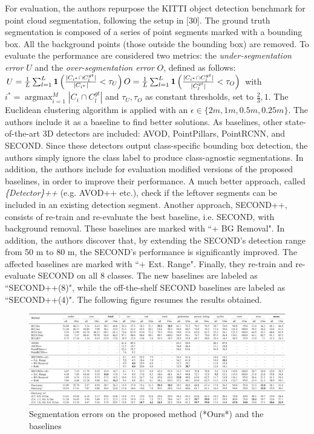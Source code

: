 For evaluation, the authors repurpose the KITTI object detection
benchmark for point cloud segmentation, following the setup in {[}30{]}.
The ground truth segmentation is composed of a series of point segments
marked with a bounding box. All the background points (those outside the
bounding box) are removed. To evaluate the performance are considered
two metrics: the \emph{under-segmentation error} $U$ and the
\emph{over-segmentation error} $O$, defined as follows:
\newline
$ U = \frac{1}{L} \sum _{l=1}^L \mathbf {1} \left(\frac{|C_{i^*} \cap C_l^{gt}|}{|C_{i^*}|} < \tau _U\right) \\ O = \frac{1}{L} \sum _{l=1}^L \mathbf {1} \left(\frac{|C_{i^*} \cap C_l^{gt}|}{|C_l^{gt}|} < \tau _O\right)$
\newline
with
\newline
$ i^* = \operatorname{argmax}_{i=1}^M{|C_i \cap C^{gt}_l|}$
\newline
and $\tau _U, \tau _O$ as constant thresholds, set to
$\frac{2}{3}, 1$.
\newline
The Euclidean clustering algorithm is applied with an
$\epsilon \in \{2 m, 1 m, 0.5 m, 0.25 m\}$. The authors include it as
a baseline to find better solutions. As baselines, other
state-of-the-art 3D detectors are included: AVOD, PointPillars,
PointRCNN, and SECOND. Since these detectors output class-specific
bounding box detection, the authors simply ignore the class label to
produce class-agnostic segmentations. In addition, the authors include
for evaluation modified versions of the proposed baselines, in order to
improve their performance. A much better approach, called
\emph{\{Detector\}++} (e.g. AVOD++ etc.), check if the leftover segments
can be included in an existing detection segment. Another approach,
SECOND++, consists of re-train and re-evaluate the best baseline, i.e.
SECOND, with background removal. These baselines are marked with ``+ BG
Removal". In addition, the authors discover that, by extending the
SECOND's detection range from 50 m to 80 m, the SECOND's performance is
significantly improved. The affected baselines are marked with ``+ Ext.
Range". Finally, they re-train and re-evaluate SECOND on all 8 classes.
The new baselines are labeled as ``SECOND++(8)", while the off-the-shelf
SECOND baselines are labeled as ``SECOND++(4)". The following figure
resumes the results obtained.

\begin{figure}[h!]
\centering
\includegraphics[width=1\linewidth]{images/segmentationerrors.png}
\caption{Segmentation errors on the proposed method (*Ours*) and the baselines}
\end{figure}

